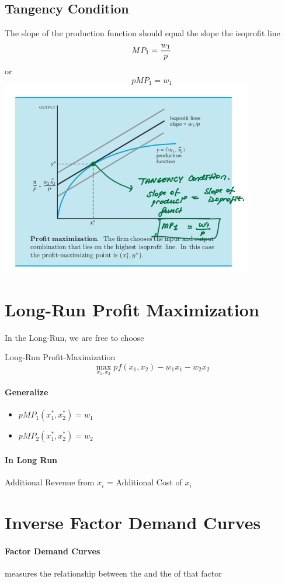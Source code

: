 \documentclass{report}
\begin{document}
\subsection{Tangency Condition}
The slope of the production function should equal the slope the isoprofit line
$$MP_1 = {w_1\over p}$$
or
$$pMP_1=w_1$$
\includegraphics[width = \textwidth]{econ12}
\section{Long-Run Profit Maximization}
In the Long-Run, we are free to choose 
\begin{defbox}
Long-Run Profit-Maximization
$$\max_{x_1,x_2} pf(x_1,x_2)-w_1x_1-w_2x_2$$
\end{defbox}
\paragraph{Generalize}
\begin{itemize}
\item $pMP_1(x_1^*,x_2^*)=w_1$
\item $pMP_2(x_1^*,x_2^*)=w_2$
\end{itemize}
\paragraph{In Long Run}
Additional Revenue from $x_i$ = Additional Cost of $x_i$
\section{Inverse Factor Demand Curves}
\paragraph{Factor Demand Curves}
measures the relationship between the  and the  of that factor
\end{document}
